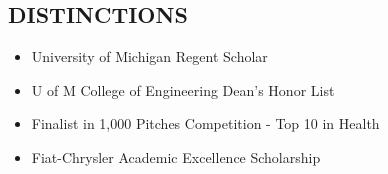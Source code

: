 \documentclass[line,margin]{res}
\begin{document}
\begin{resume}
\section{\textcolor{HeaderColor}{DISTINCTIONS}}
    \begin{itemize} \itemsep-0.2em
    \item University of Michigan Regent Scholar
    \item U of M College of Engineering Dean’s Honor List
    \item Finalist in 1,000 Pitches Competition - Top 10 in Health
    \item Fiat-Chrysler Academic Excellence Scholarship
    \end{itemize}
 

\end{resume}
\end{document}
